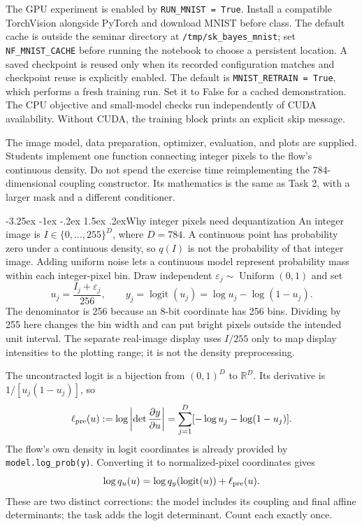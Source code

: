\documentclass[11pt,a4paper]{article}
\makeatletter
\newcommand{\R}{\mathbb R}
\renewcommand\subsection{\@startsection{subsection}{2}{\z@}%
  {-3.25ex \@plus -1ex \@minus -.2ex}%
  {1.5ex \@plus .2ex}{\normalfont\large}}
\makeatother
\begin{document}
The GPU experiment is enabled by \texttt{RUN\_MNIST = True}. Install a compatible
TorchVision alongside PyTorch and download MNIST before class. The default
cache is outside the seminar directory at \texttt{/tmp/sk\_bayes\_mnist}; set
\texttt{NF\_MNIST\_CACHE} before running the notebook to choose a persistent
location. A saved checkpoint is reused only when its recorded configuration
matches and checkpoint reuse is explicitly enabled. The default is
\texttt{MNIST\_RETRAIN = True}, which performs a fresh training run. Set it
to False for a cached demonstration. The CPU objective
and small-model checks run independently of CUDA availability. Without CUDA,
the training block prints an explicit skip message.

The image model, data preparation, optimizer, evaluation, and plots are
supplied. Students implement one function connecting integer pixels to the
flow's continuous density. Do not spend the exercise time reimplementing the
784-dimensional coupling constructor. Its mathematics is the same as Task 2,
with a larger mask and a different conditioner.

\subsection{Why integer pixels need dequantization}
An integer image is $I\in\{0,\ldots,255\}^D$, where $D=784$. A continuous
point has probability zero under a continuous density, so $q(I)$ is not the
probability of that integer image. Adding uniform noise lets a continuous
model represent probability mass within each integer-pixel bin. Draw
independent $\varepsilon_j\sim\operatorname{Uniform}(0,1)$ and set
\[
 u_j=\frac{I_j+\varepsilon_j}{256},\qquad
 y_j=\operatorname{logit}(u_j)=\log u_j-\log(1-u_j).
\]
The denominator is 256 because an 8-bit coordinate has 256 bins. Dividing by
255 here changes the bin width and can put bright pixels outside the intended
unit interval. The separate real-image display uses $I/255$ only to map display
intensities to the plotting range; it is not the density preprocessing.

The uncontracted logit is a bijection from $(0,1)^D$ to $\R^D$. Its derivative
is $1/[u_j(1-u_j)]$, so
\[
 \ell_{\rm pre}(u)
 :=\log\left|\det\frac{\partial y}{\partial u}\right|
 =\sum_{j=1}^D[-\log u_j-\log(1-u_j)].
\]
The flow's own density in logit coordinates is already provided by
\texttt{model.log\_prob(y)}. Converting it to normalized-pixel coordinates gives
\[
 \log q_u(u)=\log q_y(\operatorname{logit}(u))+\ell_{\rm pre}(u).
\]
These are two distinct corrections: the model includes its coupling and final
affine determinants; the task adds the logit determinant. Count each exactly
once.
\end{document}
